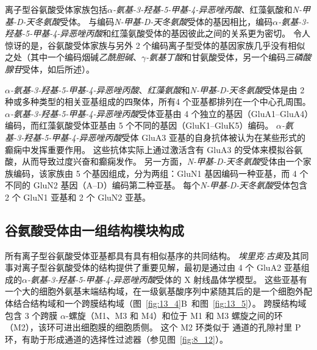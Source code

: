 离子型谷氨酸受体家族包括\textit{$\alpha$-氨基-3-羟基-5-甲基-4-异恶唑丙酸}、红藻氨酸和\textit{N-甲基-D-天冬氨酸}受体。
与编码\textit{N-甲基-D-天冬氨酸}受体的基因相比，编码\textit{$\alpha$-氨基-3-羟基-5-甲基-4-异恶唑丙酸}和红藻氨酸受体的基因彼此之间的关系更为密切。
令人惊讶的是，谷氨酸受体家族与另外 2 个编码离子型受体的基因家族几乎没有相似之处（其中一个编码烟碱\textit{乙酰胆碱}、\textit{$\gamma$-氨基丁酸}和甘氨酸受体，另一个编码\textit{三磷酸腺苷}受体，如后所述）。


\textit{$\alpha$-氨基-3-羟基-5-甲基-4-异恶唑丙酸}、\textit{红藻氨酸}和\textit{N-甲基-D-天冬氨酸}受体是由 2 种或多种类型的相关亚基组成的四聚体，所有4 个亚基都排列在一个中心孔周围。
\textit{$\alpha$-氨基-3-羟基-5-甲基-4-异恶唑丙酸}受体亚基由 4 个独立的基因（GluA1–GluA4）编码，而红藻氨酸受体亚基由 5 个不同的基因（GluK1–GluK5）编码。
\textit{$\alpha$-氨基-3-羟基-5-甲基-4-异恶唑丙酸}受体 GluA3 亚基的自身抗体被认为在某些形式的癫痫中发挥重要作用。
这些抗体实际上通过激活含有 GluA3 的受体来模拟谷氨酸，从而导致过度兴奋和癫痫发作。
另一方面，\textit{N-甲基-D-天冬氨酸}受体由一个家族编码，该家族由 5 个基因组成，分为两组：GluN1 基因编码一种亚基，而 4 个不同的 GluN2 基因（A–D）编码第二种亚基。
每个\textit{N-甲基-D-天冬氨酸}受体包含 2 个 GluN1 亚基和 2 个 GluN2 亚基。



\subsection{谷氨酸受体由一组结构模块构成}

所有离子型谷氨酸受体亚基都具有具有相似基序的共同结构。
\textit{埃里克$\cdot$古奥}及其同事对离子型谷氨酸受体的结构提供了重要见解，最初是通过由 4 个 GluA2 亚基组成的\textit{$\alpha$-氨基-3-羟基-5-甲基-4-异恶唑丙酸}受体的 X 射线晶体学模型。
这些亚基有一个大的细胞外氨基末端结构域，在一级氨基酸序列中紧随其后的是一个细胞外配体结合结构域和一个跨膜结构域（图~\ref{fig:13_4}B~和图~\ref{fig:13_5}）。
跨膜结构域包含 3 个跨膜 $\alpha$-螺旋（M1、M3 和 M4）和位于 M1 和 M3 螺旋之间的环（M2），该环可进出细胞膜的细胞质侧。
这个 M2 环类似于  通道的孔隙衬里 P 环，有助于形成通道的选择性过滤器（参见图~\ref{fig:8_12}）。


